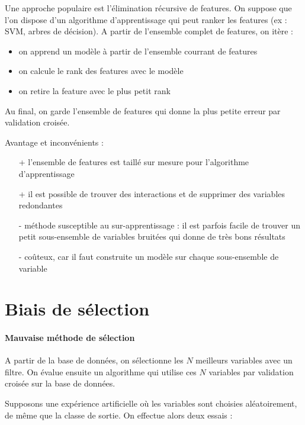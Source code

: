Une approche populaire est l'élimination récursive de features. On suppose que l'on dispose d'un algorithme d'apprentissage qui peut ranker les features (ex : SVM, arbres de décision). A partir de l'ensemble complet de features, on itère :

\begin{itemize}
	\item on apprend un modèle à partir de l'ensemble courrant de features
	\item on calcule le rank des features avec le modèle
	\item on retire la feature avec le plus petit rank
\end{itemize}

Au final, on garde l'ensemble de features qui donne la plus petite erreur par validation croisée.


Avantage et inconvénients :

\begin{itemize}
	\item[+] l'ensemble de features est taillé sur mesure pour l'algorithme d'apprentissage
	\item[+] il est possible de trouver des interactions et de supprimer des variables redondantes
	\item[-] méthode susceptible au sur-apprentissage : il est parfois facile de trouver un petit sous-ensemble de variables bruitées qui donne de très bons résultats
	\item[-] coûteux, car il faut construite un modèle sur chaque sous-ensemble de variable
\end{itemize}


\section{Biais de sélection}

\paragraph{Mauvaise méthode de sélection}

A partir de la base de données, on sélectionne les $N$ meilleurs variables avec un filtre. On évalue ensuite un algorithme qui utilise ces $N$ variables par validation croisée sur la base de données.

Supposons une expérience artificielle où les variables sont choisies aléatoirement, de même que la classe de sortie. On effectue alors deux essais :

